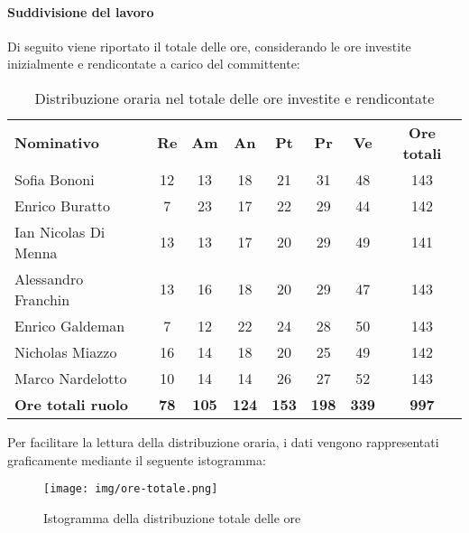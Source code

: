 \documentclass[../piano-di-progetto.tex]{subfiles}
\begin{document}
  \paragraph{Suddivisione del lavoro}
  Di seguito viene riportato il totale delle ore, considerando le ore investite inizialmente e rendicontate a carico del committente:
  \begin{table}[H]
    \centering
    \begin{tabular}{lccccccc}
      \rowcolor{lightgray}
\textbf{Nominativo}       & \textbf{Re} & \textbf{Am}  & \textbf{An}  & \textbf{Pt}  & \textbf{Pr}  & \textbf{Ve}  & \textbf{Ore totali} \\
Sofia Bononi              & 12          & 13           & 18           & 21           & 31           & 48           & 143                 \\
Enrico Buratto            & 7           & 23           & 17           & 22           & 29           & 44           & 142                 \\
Ian Nicolas Di Menna      & 13          & 13           & 17           & 20           & 29           & 49           & 141                 \\
Alessandro Franchin       & 13          & 16           & 18           & 20           & 29           & 47           & 143                 \\
Enrico Galdeman           & 7           & 12           & 22           & 24           & 28           & 50           & 143                 \\
Nicholas Miazzo           & 16          & 14           & 18           & 20           & 25           & 49           & 142                 \\
Marco Nardelotto          & 10          & 14           & 14           & 26           & 27           & 52           & 143                 \\
\textbf{Ore totali ruolo} & \textbf{78} & \textbf{105} & \textbf{124} & \textbf{153} & \textbf{198} & \textbf{339} & \textbf{997}       

    \end{tabular}
    \caption{Distribuzione oraria nel totale delle ore investite e rendicontate}
    \end{table}

    Per facilitare la lettura della distribuzione oraria, i dati vengono rappresentati graficamente mediante il seguente istogramma:
    \begin{figure}[H]
      \centering
      \texttt{[image: img/ore-totale.png]}
      \caption{Istogramma della distribuzione totale delle ore}
      \label{fig:ore-totali}
    \end{figure}
\end{document}
